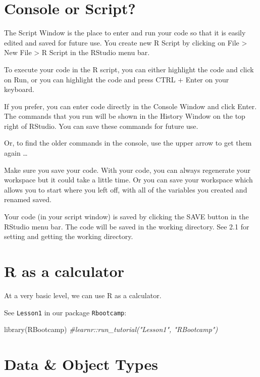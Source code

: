 \documentclass[
]{book}
\newenvironment{Shaded}{\begin{snugshade}}{\end{snugshade}}
\newcommand{\CommentTok}[1]{\textcolor[rgb]{0.56,0.35,0.01}{\textit{#1}}}
\newcommand{\FunctionTok}[1]{\textcolor[rgb]{0.00,0.00,0.00}{#1}}
\newcommand{\NormalTok}[1]{#1}
\theoremstyle{definition}
\theoremstyle{definition}
\theoremstyle{definition}
\theoremstyle{definition}
\theoremstyle{remark}
\begin{document}
\hypertarget{console-or-script}{%
\section{Console or Script?}\label{console-or-script}}

The Script Window is the place to enter and run your code so that it is easily edited and saved for future use. You create new R Script by clicking on File \textgreater{} New File \textgreater{} R Script in the RStudio menu bar.

To execute your code in the R script, you can either highlight the code and click on Run, or you can highlight the code and press CTRL + Enter on your keyboard.

If you prefer, you can enter code directly in the Console Window and click Enter. The commands that you run will be shown in the History Window on the top right of RStudio. You can save these commands for future use.

Or, to find the older commands in the console, use the upper arrow to get them again \ldots{}

Make sure you save your code. With your code, you can always regenerate your workspace but it could take a little time. Or you can save your workspace which allows you to start where you left off, with all of the variables you created and renamed saved.

Your code (in your script window) is saved by clicking the SAVE button in the RStudio menu bar. The code will be saved in the working directory. See 2.1 for setting and getting the working directory.

\hypertarget{r-as-a-calculator}{%
\section{R as a calculator}\label{r-as-a-calculator}}

At a very basic level, we can use R as a calculator.

See \texttt{Lesson1} in our package \texttt{Rbootcamp}:

\begin{Shaded}
\begin{Highlighting}[]
\FunctionTok{library}\NormalTok{(RBootcamp)}
\CommentTok{\#learnr::run\_tutorial("Lesson1", "RBootcamp")}
\end{Highlighting}
\end{Shaded}

\hypertarget{data-object-types}{%
\section{Data \& Object Types}\label{data-object-types}}
\end{document}
